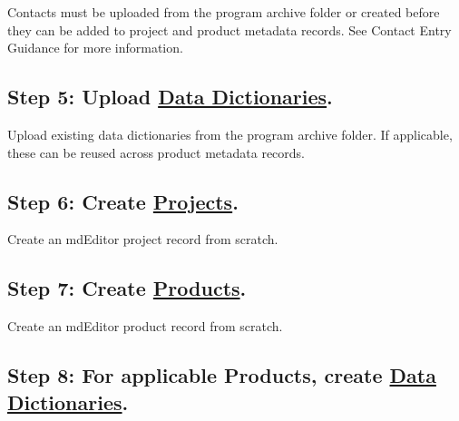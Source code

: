 \documentclass[
]{book}
\begin{document}
Contacts must be uploaded from the program archive folder or created before they can be added to project and product metadata records. See Contact Entry Guidance for more information.

\hypertarget{step-5-upload-data-dictionaries.}{%
\subsection*{\texorpdfstring{Step 5: Upload \protect\hyperlink{dictionary-entry-guidance}{Data Dictionaries}.}{Step 5: Upload Data Dictionaries.}}\label{step-5-upload-data-dictionaries.}}

Upload existing data dictionaries from the program archive folder. If applicable, these can be reused across product metadata records.

\hypertarget{step-6-create-projects.}{%
\subsection*{\texorpdfstring{Step 6: Create \protect\hyperlink{project-entry-guidance}{Projects}.}{Step 6: Create Projects.}}\label{step-6-create-projects.}}

Create an mdEditor project record from scratch.

\hypertarget{step-7-create-products.}{%
\subsection*{\texorpdfstring{Step 7: Create \protect\hyperlink{product-entry-guidance}{Products}.}{Step 7: Create Products.}}\label{step-7-create-products.}}

Create an mdEditor product record from scratch.

\hypertarget{step-8-for-applicable-products-create-data-dictionaries.}{%
\subsection*{\texorpdfstring{Step 8: For applicable Products, create \protect\hyperlink{dictionary-entry-guidance}{Data Dictionaries}.}{Step 8: For applicable Products, create Data Dictionaries.}}\label{step-8-for-applicable-products-create-data-dictionaries.}}
\end{document}
